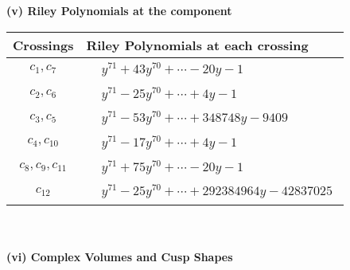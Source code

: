 \documentclass[1p]{elsarticle_modified}
\theoremstyle{definition}
\begin{document}
\newpage\renewcommand{\arraystretch}{1}
\flushleft \textbf{(v) Riley Polynomials at the component}\newline \\
\begin{tabular}{m{50pt}|m{274pt}}
Crossings & \hspace{64pt}Riley Polynomials at each crossing \\
\hline $$\begin{aligned}c_{1},c_{7}\end{aligned}$$&$\begin{aligned}
&y^{71}+43 y^{70}+\cdots-20 y-1
\end{aligned}$\\
\hline $$\begin{aligned}c_{2},c_{6}\end{aligned}$$&$\begin{aligned}
&y^{71}-25 y^{70}+\cdots+4 y-1
\end{aligned}$\\
\hline $$\begin{aligned}c_{3},c_{5}\end{aligned}$$&$\begin{aligned}
&y^{71}-53 y^{70}+\cdots+348748 y-9409
\end{aligned}$\\
\hline $$\begin{aligned}c_{4},c_{10}\end{aligned}$$&$\begin{aligned}
&y^{71}-17 y^{70}+\cdots+4 y-1
\end{aligned}$\\
\hline $$\begin{aligned}c_{8},c_{9},c_{11}\end{aligned}$$&$\begin{aligned}
&y^{71}+75 y^{70}+\cdots-20 y-1
\end{aligned}$\\
\hline $$\begin{aligned}c_{12}\end{aligned}$$&$\begin{aligned}
&y^{71}-25 y^{70}+\cdots+292384964 y-42837025
\end{aligned}$\\
\hline
\end{tabular}\\~\\
\newpage\flushleft \textbf{(vi) Complex Volumes and Cusp Shapes}
\end{document}
